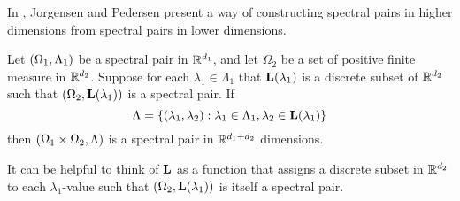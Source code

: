 \documentclass[../thesis.tex]{subfiles}
\begin{document}
In \cite{jorgensenSpectralPairsCartesian2001}, Jorgensen and Pedersen present a way of constructing spectral pairs in higher dimensions from spectral pairs in lower dimensions. 

\begin{theorem}\label{thrm:construction_spectra}
    Let $(\Omega_1,\Lambda_1)$ be a spectral pair in $\mathbb{R}^{d_1}$, and let $\Omega_2$ be a set of positive finite measure in $\mathbb{R}^{d_2}$. Suppose for each $\lambda_1 \in \Lambda_1$ that $\mathbf{L}(\lambda_1)$ is a discrete subset of $\mathbb{R}^{d_2}$ such that $(\Omega_2,\mathbf{L}(\lambda_1))$ is a spectral pair. If 
    \begin{equation}\label{eq:construction_spectra}
        \Lambda = \{(\lambda_1, \lambda_2): \lambda_1\in \Lambda_1, \lambda_2 \in \mathbf{L}(\lambda_1)\} 
    \end{equation}
    then $(\Omega_1\times\Omega_2, \Lambda)$ is a spectral pair in $\mathbb{R}^{d_1+d_2}$ dimensions. 
\end{theorem}

\begin{remark}
    It can be helpful to think of $\mathbf{L}$ as a function that assigns a discrete subset in $\mathbb{R}^{d_2}$ to each $\lambda_1$-value such that $(\Omega_2,\mathbf{L}(\lambda_1))$ is itself a spectral pair. %
\end{remark}
\end{document}
